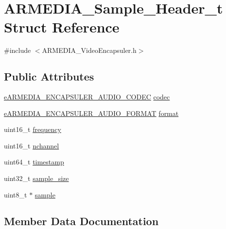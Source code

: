 \hypertarget{struct_a_r_m_e_d_i_a___sample___header__t}{}\section{A\+R\+M\+E\+D\+I\+A\+\_\+\+Sample\+\_\+\+Header\+\_\+t Struct Reference}
\label{struct_a_r_m_e_d_i_a___sample___header__t}


{\ttfamily \#include $<$A\+R\+M\+E\+D\+I\+A\+\_\+\+Video\+Encapsuler.\+h$>$}

\subsection*{Public Attributes}
\begin{DoxyCompactItemize}
\item 
\hyperlink{_a_r_m_e_d_i_a___video_encapsuler_8h_aa466ae187faa82f79103c4dad64d80e1}{e\+A\+R\+M\+E\+D\+I\+A\+\_\+\+E\+N\+C\+A\+P\+S\+U\+L\+E\+R\+\_\+\+A\+U\+D\+I\+O\+\_\+\+C\+O\+D\+EC} \hyperlink{struct_a_r_m_e_d_i_a___sample___header__t_a8c2829b4be6789b936c10596a2aab8c7}{codec}
\item 
\hyperlink{_a_r_m_e_d_i_a___video_encapsuler_8h_a5a6d90018be954b43e503ed732a657e8}{e\+A\+R\+M\+E\+D\+I\+A\+\_\+\+E\+N\+C\+A\+P\+S\+U\+L\+E\+R\+\_\+\+A\+U\+D\+I\+O\+\_\+\+F\+O\+R\+M\+AT} \hyperlink{struct_a_r_m_e_d_i_a___sample___header__t_aa37af1a085b62d36da19c7b854eff864}{format}
\item 
uint16\+\_\+t \hyperlink{struct_a_r_m_e_d_i_a___sample___header__t_a82d73120e308cff39f2d3ffdae0ccb35}{frequency}
\item 
uint16\+\_\+t \hyperlink{struct_a_r_m_e_d_i_a___sample___header__t_a958dede0808ee5d63df5429f60042d72}{nchannel}
\item 
uint64\+\_\+t \hyperlink{struct_a_r_m_e_d_i_a___sample___header__t_a8f6d90278030e89cc27d23aeaa58e542}{timestamp}
\item 
uint32\+\_\+t \hyperlink{struct_a_r_m_e_d_i_a___sample___header__t_a7a12d98433c1fd518f2ce040cf0dd595}{sample\+\_\+size}
\item 
uint8\+\_\+t $\ast$ \hyperlink{struct_a_r_m_e_d_i_a___sample___header__t_a295bfc73ed5fa7298db83dac4821889a}{sample}
\end{DoxyCompactItemize}


\subsection{Member Data Documentation}
